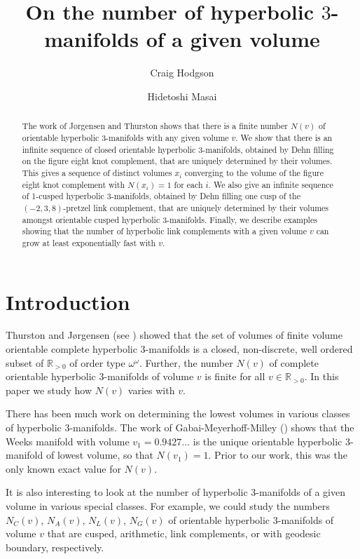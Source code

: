 \documentclass[reqno]{amsproc}  %
\title{On the number of hyperbolic $3$-manifolds of a given volume}
\author[Hodgson]{Craig Hodgson}
\author[Masai]{Hidetoshi Masai}
\date{}
\def\R{\mathbb{R}}
\begin{document}
\thispagestyle{headings}


\begin{abstract}
The work of J{\o}rgensen and Thurston shows that there is a finite number $N(v)$ 
of orientable hyperbolic 3-manifolds with any given volume  $v$.   
We show that there is an infinite sequence of closed orientable hyperbolic 3-manifolds,
obtained by Dehn filling on the figure eight knot complement, 
that are uniquely determined by their volumes. This gives a sequence of distinct 
volumes $x_i $ converging to the volume of the figure eight knot complement 
with $N(x_i) = 1$ for each $i$.  We also give
an infinite sequence of 1-cusped hyperbolic 3-manifolds, obtained
by Dehn filling one cusp of  the $(-2,3,8)$-pretzel link complement, 
that are uniquely determined by their volumes amongst orientable cusped 
hyperbolic 3-manifolds. 
Finally, we describe examples showing that the number of hyperbolic link complements
with a given volume $v$ can grow at least exponentially fast with $v$.
\end{abstract}

\maketitle

\section{Introduction}
Thurston and J{\o}rgensen (see \cite{Th}) showed that the set of volumes of finite volume 
orientable complete hyperbolic $3$-manifolds is a closed, non-discrete, well ordered 
subset of $\R_{>0}$ of order type $\omega^\omega$. 
Further, the number $N(v)$ of complete orientable hyperbolic $3$-manifolds of volume $v$ is finite 
for all $v\in \mathbb{R}_{>0}$. In this paper we study how $N(v)$ varies with $v$.

There has been much work on determining the lowest volumes in various classes of
hyperbolic 3-manifolds.
The work of Gabai-Meyerhoff-Milley (\cite{GMM1,GMM2,M}) 
shows that the Weeks manifold  
with volume $v_1 = 0.9427 \ldots$ is the unique orientable 
hyperbolic 3-manifold of lowest volume, so that $N(v_1)=1$.
Prior to our work,  this was the only known exact value for $N(v)$.
 
 It is also interesting  to look at the number of hyperbolic 3-manifolds of a given volume in various special classes.
For example, we could study the numbers $N_C (v)$, $N_A(v)$, $N_L(v)$, $N_G(v)$
of orientable hyperbolic 3-manifolds of volume $v$ that are cusped, arithmetic, link complements, or with
geodesic boundary, respectively. 
\end{document}
